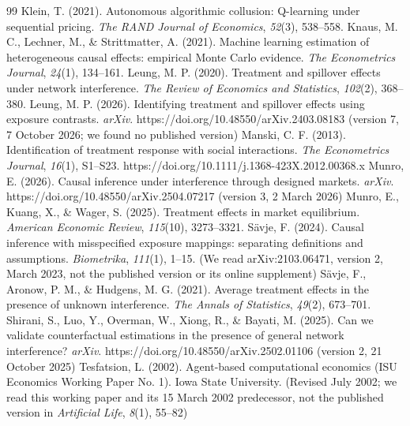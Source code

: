 \documentclass[11pt]{article}
\begin{document}
\begin{thebibliography}{99}
 Klein, T. (2021). Autonomous algorithmic collusion: Q-learning under sequential pricing. \textit{The RAND Journal of Economics}, \textit{52}(3), 538--558.
 Knaus, M. C., Lechner, M., \& Strittmatter, A. (2021). Machine learning estimation of heterogeneous causal effects: empirical Monte Carlo evidence. \textit{The Econometrics Journal}, \textit{24}(1), 134--161.
 Leung, M. P. (2020). Treatment and spillover effects under network interference. \textit{The Review of Economics and Statistics}, \textit{102}(2), 368--380.
 Leung, M. P. (2026). Identifying treatment and spillover effects using exposure contrasts. \textit{arXiv}. https://doi.org/10.48550/arXiv.2403.08183 (version 7, 7 October 2026; we found no published version)
 Manski, C. F. (2013). Identification of treatment response with social interactions. \textit{The Econometrics Journal}, \textit{16}(1), S1--S23. https://doi.org/10.1111/j.1368-423X.2012.00368.x
 Munro, E. (2026). Causal inference under interference through designed markets. \textit{arXiv}. https://doi.org/10.48550/arXiv.2504.07217 (version 3, 2 March 2026)
 Munro, E., Kuang, X., \& Wager, S. (2025). Treatment effects in market equilibrium. \textit{American Economic Review}, \textit{115}(10), 3273--3321.
 S\"avje, F. (2024). Causal inference with misspecified exposure mappings: separating definitions and assumptions. \textit{Biometrika}, \textit{111}(1), 1--15. (We read arXiv:2103.06471, version 2, March 2023, not the published version or its online supplement)
 S\"avje, F., Aronow, P. M., \& Hudgens, M. G. (2021). Average treatment effects in the presence of unknown interference. \textit{The Annals of Statistics}, \textit{49}(2), 673--701.
 Shirani, S., Luo, Y., Overman, W., Xiong, R., \& Bayati, M. (2025). Can we validate counterfactual estimations in the presence of general network interference? \textit{arXiv}. https://doi.org/10.48550/arXiv.2502.01106 (version 2, 21 October 2025)
 Tesfatsion, L. (2002). Agent-based computational economics (ISU Economics Working Paper No. 1). Iowa State University. (Revised July 2002; we read this working paper and its 15 March 2002 predecessor, not the published version in \textit{Artificial Life}, \textit{8}(1), 55--82)

\end{thebibliography}
\end{document}
